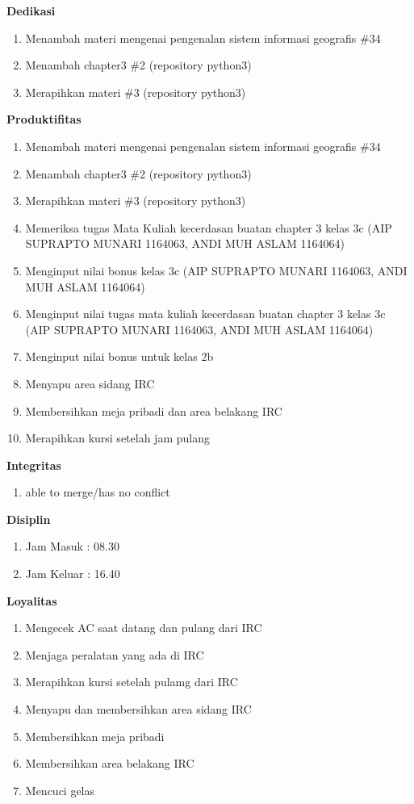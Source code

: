 \begin{enumerate}
\textbf{Dedikasi}
\begin{enumerate}
\item Menambah materi mengenai pengenalan sistem informasi geografis \#34
\item Menambah chapter3 \#2 (repository python3)
\item Merapihkan materi \#3 (repository python3)
\end{enumerate}

\textbf{Produktifitas}
\begin{enumerate}
\item Menambah materi mengenai pengenalan sistem informasi geografis \#34
\item Menambah chapter3 \#2 (repository python3)
\item Merapihkan materi \#3 (repository python3)
\item Memeriksa tugas Mata Kuliah kecerdasan buatan chapter 3 kelas 3c (AIP SUPRAPTO MUNARI 1164063, ANDI MUH ASLAM 1164064)
\item Menginput nilai bonus kelas 3c (AIP SUPRAPTO MUNARI 1164063, ANDI MUH ASLAM 1164064)
\item Menginput nilai tugas mata kuliah kecerdasan buatan chapter 3 kelas 3c (AIP SUPRAPTO MUNARI 1164063, ANDI MUH ASLAM 1164064)
\item Menginput nilai bonus untuk kelas 2b
\item Menyapu area sidang IRC
\item Membersihkan meja pribadi dan area belakang IRC
\item Merapihkan kursi setelah jam pulang 
\end{enumerate}

\textbf{Integritas}
\begin{enumerate}
\item able to merge/has no conflict
\end{enumerate}

\textbf{Disiplin}
\begin{enumerate}
\item Jam Masuk : 08.30
\item Jam Keluar : 16.40
\end{enumerate}

\textbf{Loyalitas}
\begin{enumerate}
\item Mengecek AC saat datang dan pulang dari IRC
\item Menjaga peralatan yang ada di IRC
\item Merapihkan kursi setelah pulamg dari IRC
\item Menyapu dan membersihkan area sidang IRC
\item Membersihkan meja pribadi
\item Membersihkan area belakang IRC
\item Mencuci gelas
\end{enumerate}


\end{enumerate}
